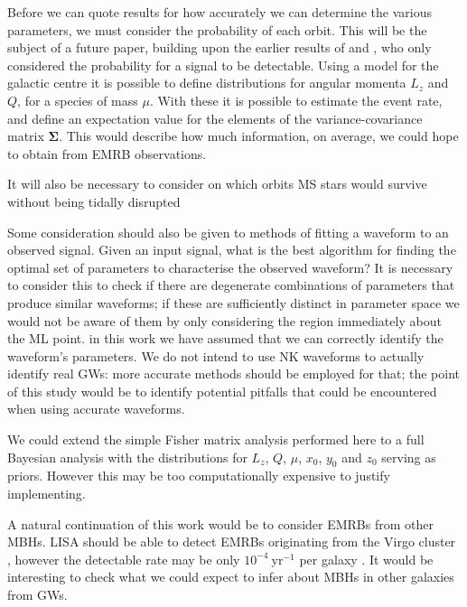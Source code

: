 \documentclass[useAMS,usedcolumn,usegraphicx,usenatbib]{mn2e}
\newcommand{\units}[1]{\ensuremath{~\mathrm{#1}}}
\begin{document}
{Before we can quote results for how accurately we can determine the various parameters, we must consider the probability of each orbit. This will be the subject of a future paper, building upon the earlier results of \citet{Rubbo2006} and \citet{Hopman2007}, who only considered the probability for a signal to be detectable. Using a model for the galactic centre it is possible to define distributions for angular momenta $L_z$ and $Q$, for a species of mass $\mu$. With these it is possible to estimate the event rate, and define an expectation value for the elements of the variance-covariance matrix $\boldsymbol{\Sigma}$. This would describe how much information, on average, we could hope to obtain from EMRB observations.

It will also be necessary to consider on which orbits MS stars would survive without being tidally disrupted \citep{Kobayashi2004}

Some consideration should also be given to methods of fitting a waveform to an observed signal. Given an input signal, what is the best algorithm for finding the optimal set of parameters to characterise the observed waveform? It is necessary to consider this to check if there are degenerate combinations of parameters that produce similar waveforms; if these are sufficiently distinct in parameter space we would not be aware of them by only considering the region immediately about the ML point. in this work we have assumed that we can correctly identify the waveform's parameters. We do not intend to use NK waveforms to actually identify real GWs: more accurate methods should be employed for that; the point of this study would be to identify potential pitfalls that could be encountered when using accurate waveforms.

We could extend the simple Fisher matrix analysis performed here to a full Bayesian analysis with the distributions for $L_z$, $Q$, $\mu$, $x_0$, $y_0$ and $z_0$ serving as priors. However this may be too computationally expensive to justify implementing.

A natural continuation of this work would be to consider EMRBs from other MBHs. LISA should be able to detect EMRBs originating from the Virgo cluster \citep{Rubbo2006}, however the detectable rate may be only $10^{-4}\units{yr^{-1}}$ per galaxy \citep{Hopman2007}. It would be interesting to check what we could expect to infer about MBHs in other galaxies from GWs.





}
\end{document}
